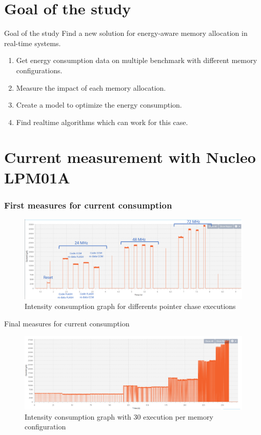 \documentclass[
	11pt, %
]{beamer}
\begin{document}
\section{Goal of the study}

\begin{frame}{Goal of the study}
	Find a new solution for energy-aware memory allocation in real-time systems.
	\begin{enumerate}
		\item Get energy consumption data on multiple benchmark with different memory configurations.
		\item Measure the impact of each memory allocation.
		\item Create a model to optimize the energy consumption.
		\item Find realtime algorithms which can work for this case.
	\end{enumerate}
\end{frame}

\section{Current measurement with Nucleo LPM01A} %
\begin{frame}
	\frametitle{First measures for current consumption}
	\begin{figure}
		\centering
        \includegraphics[scale=0.6]{images/pointer_chase_capture_mod.png}
        \caption{Intensity consumption graph for differents pointer chase executions}
	\end{figure}
\end{frame}

\begin{frame}{Final measures for current consumption}
	\begin{figure}
		\centering
        \includegraphics[scale=0.4]{images/pointer_chase30ex.png}
        \caption{Intensity consumption graph with 30 execution per memory configuration}
	\end{figure}
\end{frame}
\end{document}
